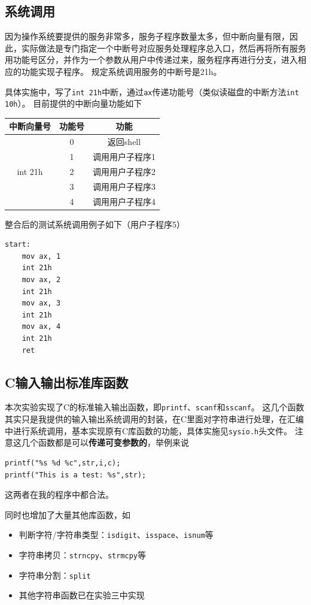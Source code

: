 \documentclass[logo,reportComp]{thesis}
\begin{document}
\subsection{系统调用}
因为操作系统要提供的服务非常多，服务子程序数量太多，但中断向量有限，因此，实际做法是专门指定一个中断号对应服务处理程序总入口，然后再将所有服务用功能号区分，并作为一个参数从用户中传递过来，服务程序再进行分支，进入相应的功能实现子程序。
规定系统调用服务的中断号是21h。

具体实施中，写了\verb'int 21h'中断，通过\verb'ax'传递功能号（类似读磁盘的中断方法\verb'int 10h'）。
目前提供的中断向量功能如下
\begin{center}
\begin{tabular}{|c|c|c|}\hline
中断向量号 & 功能号 & 功能 \\\hline
\multirow{5}{*}{int 21h} & 0 & 返回shell\\\cline{2-3}
& 1 & 调用用户子程序1 \\\cline{2-3}
& 2 & 调用用户子程序2 \\\cline{2-3}
& 3 & 调用用户子程序3 \\\cline{2-3}
& 4 & 调用用户子程序4 \\\hline
\end{tabular}
\end{center}

整合后的测试系统调用例子如下（用户子程序5）
\begin{lstlisting}[language={[x86masm]Assembler}]
start:
	mov ax, 1
	int 21h
	mov ax, 2
	int 21h
	mov ax, 3
	int 21h
	mov ax, 4
	int 21h
	ret
\end{lstlisting}

\subsection{C输入输出标准库函数}
本次实验实现了C的标准输入输出函数，即\verb'printf'、\verb'scanf'和\verb'sscanf'。
这几个函数其实只是我提供的输入输出系统调用的封装，在C里面对字符串进行处理，在汇编中进行系统调用，基本实现原有C库函数的功能，具体实施见\verb'sysio.h'头文件。
注意这几个函数都是可以\textbf{传递可变参数的}，举例来说
\begin{lstlisting}
printf("%s %d %c",str,i,c);
printf("This is a test: %s",str);
\end{lstlisting}
这两者在我的程序中都合法。

同时也增加了大量其他库函数，如
\begin{itemize}
	\item 判断字符/字符串类型：\verb'isdigit'、\verb'isspace'、\verb'isnum'等
	\item 字符串拷贝：\verb'strncpy'、\verb'strmcpy'等
	\item 字符串分割：\verb'split'
	\item 其他字符串函数已在实验三中实现
\end{itemize}
\end{document}
